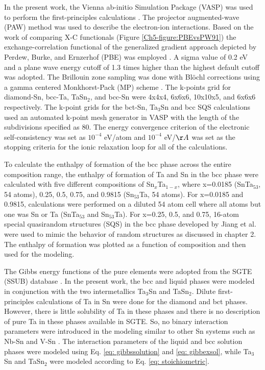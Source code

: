 In the present work, the Vienna ab-initio Simulation Package (VASP) was used to perform the first-principles calculations \cite{Kresse1996}. The projector augmented-wave (PAW) \cite{Kresse1999,Blochl1994} method was used to describe the electron-ion interactions. Based on the work of comparing X-C functionals (Figure \ref{Ch5-figure:PBEvsPW91}) the exchange-correlation functional of the generalized gradient approach depicted by Perdew, Burke, and Ernzerhof (PBE) was employed \cite{Perdew1996a}. A sigma value of 0.2 eV and a plane wave energy cutoff of 1.3 times higher than the highest default cutoff was adopted. The Brillouin zone sampling was done with Bl\"ochl corrections \cite{Blochl1994} using a gamma centered Monkhorst-Pack (MP) scheme \cite{Monkhorst1976a}. The k-points grid for diamond-Sn, bcc-Ta, TaSn$_2$, and bcc-Sn were 4x4x4, 6x6x6, 10x10x5, and 6x6x6 respectively. The k-point grids for the bct-Sn, Ta$_3$Sn and bcc SQS calculations used an automated k-point mesh generator in VASP with the length of the subdivisions specified as 80. The energy convergence criterion of the electronic self-consistency was set as $10^{-4}$ eV/atom and $10^{-4}$ eV/$\AA$ was set as the stopping criteria for the ionic relaxation loop for all of the calculations. 

To calculate the enthalpy of formation of the bcc phase across the entire composition range, the enthalpy of formation of Ta and Sn in the bcc phase were calculated with five different compositions of Sn$_{x}$Ta$_{1-x}$, where x=0.0185 (SnTa$_{53}$, 54 atoms), 0.25, 0.5, 0.75, and 0.9815 (Sn$_{53}$Ta, 54 atoms). For x=0.0185 and 0.9815, calculations were performed on a diluted 54 atom cell where all atoms but one was Sn or Ta (SnTa$_{53}$ and Sn$_{53}$Ta). For x=0.25, 0.5, and 0.75, 16-atom special quasirandom structures (SQS) in the bcc phase developed by Jiang et al. \cite{Jiang2004} were used to mimic the behavior of random structures as discussed in chapter 2. The enthalpy of formation was plotted as a function of composition and then used for the modeling.  

The Gibbs energy functions of the pure elements were adopted from the SGTE (SSUB) database \cite{Dinsdale1991}. In the present work, the bcc and liquid phases were modeled in conjunction with the two intermetallics Ta$_3$Sn and TaSn$_2$. Dilute first-principles calculations of Ta in Sn were done for the diamond and bct phases. However, there is little solubility of Ta in these phases and there is no description of pure Ta in these phases available in SGTE. So, no binary interaction parameters were introduced in the modeling similar to other Sn systems such as Nb-Sn and V-Sn \cite{Yue2009,Toffolon2002}. The interaction parameters of the liquid and bcc solution phases were modeled using Eq. \ref{eq: gibbssolution} and \ref{eq: gibbexsol}, while Ta$_3$Sn and TaSn$_2$ were modeled according to Eq. \ref{eq: stoichiometric}.

